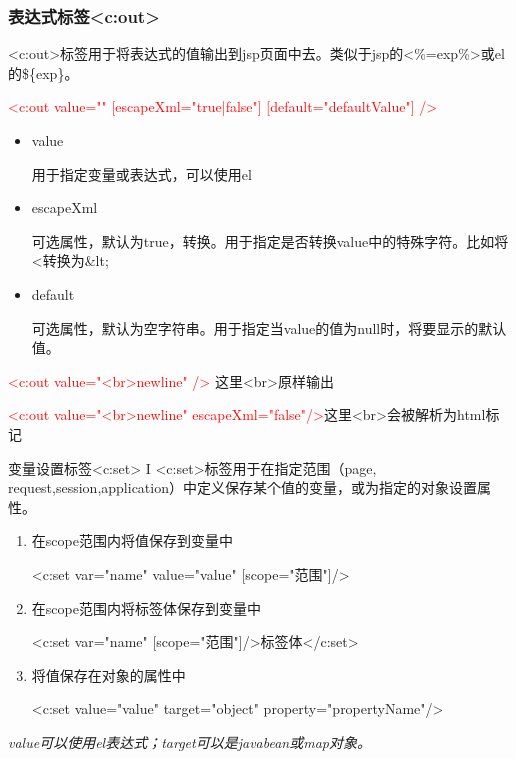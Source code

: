 \documentclass{beamer}
\begin{document}
\begin{frame}
\frametitle{表达式标签<c:out>}
<c:out>标签用于将表达式的值输出到jsp页面中去。类似于jsp的<\%=exp\%>或el的\$\{exp\}。

\textcolor{red}{<c:out value="" [escapeXml="true|false"]  [default="defaultValue"] />}
\begin{itemize}
\item
value

用于指定变量或表达式，可以使用el
\item
escapeXml

可选属性，默认为true，转换。用于指定是否转换value中的特殊字符。比如将<转换为\&lt;
\item
default

可选属性，默认为空字符串。用于指定当value的值为null时，将要显示的默认值。
\end{itemize}
\textcolor{red}{<c:out value="<br>newline" />} 这里<br>原样输出 

\textcolor{red}{ <c:out value="<br>newline" escapeXml="false"/>}这里<br>会被解析为html标记
\end{frame}

\begin{frame}{变量设置标签<c:set> I}
<c:set>标签用于在指定范围（page, request,session,application）中定义保存某个值的变量，或为指定的对象设置属性。
\begin{enumerate}
\item
在scope范围内将值保存到变量中

<c:set var="name" value="value" [scope="范围"]/>
\item
在scope范围内将标签体保存到变量中

<c:set var="name"  [scope="范围"]/>标签体</c:set>
\item
将值保存在对象的属性中

<c:set  value="value" target="object" property="propertyName"/>
\end{enumerate}
\emph{value可以使用el表达式；target可以是javabean或map对象。}
\end{frame}
\end{document}
